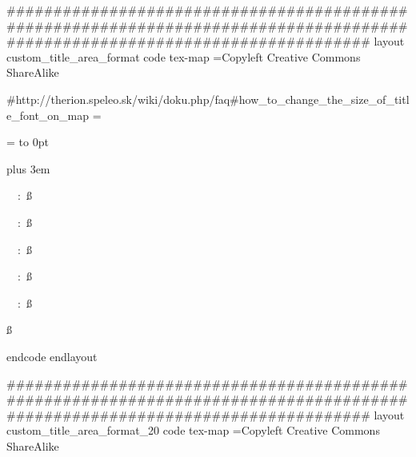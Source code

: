 #############################################################################################################################
layout custom_title_area_format
  code tex-map
  \copyrights={Copyleft Creative Commons ShareAlike}
  
  #http://therion.speleo.sk/wiki/doku.php/faq#how_to_change_the_size_of_title_font_on_map
    \legendcontent={%
      \hsize=\legendwidth
      \ifnortharrow\vbox to 0pt{\line{\hfil\northarrow}\vss}\fi
      \edef\tmp{\the\cavename} \ifx\tmp\empty \else
         {\size[120]\the\cavename} \vskip1cm
      \fi
      \ifscalebar\scalebar\vskip1cm\fi
      {\rightskip=0pt plus 3em\parskip=3bp
        \edef\tmp{\the\comment} \ifx\tmp\empty \else
           {\size[44]\the\comment} \par\medskip
         \fi
      \edef\tmp{\the\cavelength} \ifx\tmp\empty \else
        {\size[44]\si\the\cavelengthtitle: \ss\the\cavelength\par}
      \fi
      \edef\tmp{\the\cavedepth} \ifx\tmp\empty \else
        {\size[44]\si\the\cavedepthtitle: \ss\the\cavedepth\par}
      \fi
      \edef\tmp{\the\exploteam} \ifx\tmp\empty \else
        {\size[44]\si\the\explotitle:
        \ss\the\exploteam\quad\si\the\explodate\par}
      \fi
      \edef\tmp{\the\topoteam} \ifx\tmp\empty \else
        {\size[44]\si\the\topotitle: \ss\the\topoteam\quad\si\the\topodate\par}
      \fi
      \edef\tmp{\the\cartoteam} \ifx\tmp\empty \else
        {\size[44]\si\the\cartotitle:
        \ss\the\cartoteam\quad\si\the\cartodate\par}
      \fi
      \edef\tmp{\the\copyrights} \ifx\tmp\empty \else
        {\size[44]\ss\the\copyrights\par}
      \fi
     }
  }
  endcode
endlayout

#############################################################################################################################
layout custom_title_area_format_20
  code tex-map
  \copyrights={Copyleft Creative Commons ShareAlike}
  
